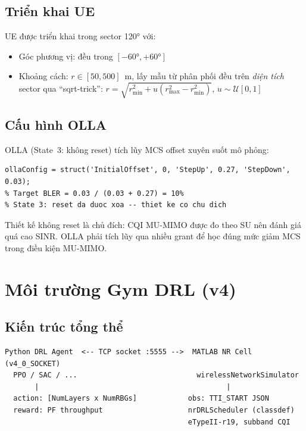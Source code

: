 \documentclass[12pt, a4paper]{article}
\begin{document}
\subsection{Triển khai UE}

UE được triển khai trong sector 120° với:
\begin{itemize}[nosep]
  \item Góc phương vị: đều trong $[-60°, +60°]$
  \item Khoảng cách: $r \in [50, 500]$~m, lấy mẫu từ phân phối đều
        trên \emph{diện tích} sector qua ``sqrt-trick'':
        $r = \sqrt{r_{\min}^2 + u(r_{\max}^2 - r_{\min}^2)}$,
        $u \sim \mathcal{U}[0,1]$
\end{itemize}

\subsection{Cấu hình OLLA}

OLLA (State~3: không reset) tích lũy MCS offset xuyên suốt mô phỏng:
\begin{lstlisting}
ollaConfig = struct('InitialOffset', 0, 'StepUp', 0.27, 'StepDown', 0.03);
% Target BLER = 0.03 / (0.03 + 0.27) = 10%
% State 3: reset da duoc xoa -- thiet ke co chu dich
\end{lstlisting}

Thiết kế không reset là chủ đích: CQI MU-MIMO được đo theo SU nên
đánh giá quá cao SINR. OLLA phải tích lũy qua nhiều grant để học đúng
mức giảm MCS trong điều kiện MU-MIMO.

\section{Môi trường Gym DRL (v4)}

\subsection{Kiến trúc tổng thể}

\begin{verbatim}
Python DRL Agent  <-- TCP socket :5555 -->  MATLAB NR Cell (v4_0_SOCKET)
  PPO / SAC / ...                            wirelessNetworkSimulator
       |                                            |
  action: [NumLayers x NumRBGs]            obs: TTI_START JSON
  reward: PF throughput                    nrDRLScheduler (classdef)
                                           eTypeII-r19, subband CQI
\end{verbatim}
\end{document}
